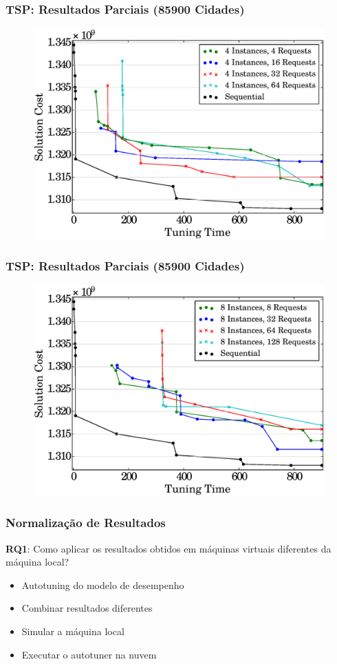 \documentclass[10pt, compress]{beamer}
\begin{document}
\begin{frame}[fragile]
  \frametitle{TSP: Resultados Parciais (85900 Cidades)}
  \begin{figure}[H]
      \centering
      \includegraphics[width=.9\textwidth]{i4_p_n_comparison_85900}
  \end{figure}
\end{frame}

\begin{frame}[fragile]
  \frametitle{TSP: Resultados Parciais (85900 Cidades)}
  \begin{figure}[H]
      \centering
      \includegraphics[width=.9\textwidth]{i8_p_n_comparison_85900}
  \end{figure}
\end{frame}

\begin{frame}[fragile]
  \frametitle{Normalização de Resultados}
  \textbf{RQ1}: Como aplicar os resultados obtidos em máquinas virtuais
  \alert{diferentes da máquina local}?

  \begin{itemize}
      \item Autotuning do \alert{modelo de desempenho}
      \item \alert{Combinar} resultados diferentes
      \item \alert{Simular} a máquina local
      \item Executar o autotuner na \alert{nuvem}
  \end{itemize}
\end{frame}


\maketitle
\end{document}
